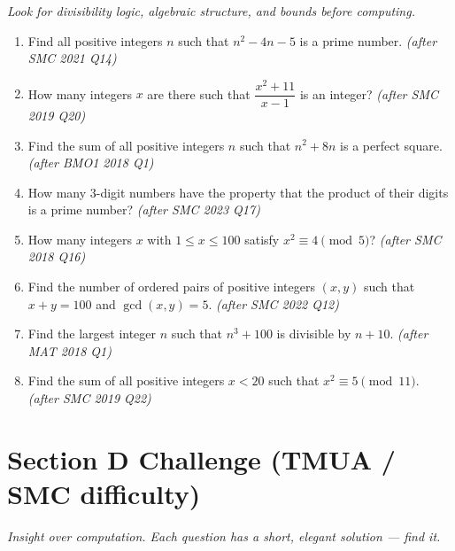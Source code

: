 \documentclass[11pt,a4paper]{article}
\begin{document}
\noindent\textit{Look for divisibility logic, algebraic structure, and bounds before computing.}

\begin{enumerate}

\item Find all positive integers $n$ such that $n^2 - 4n - 5$ is a prime number. \textit{\small(after SMC 2021 Q14)}

\item How many integers $x$ are there such that $\dfrac{x^2+11}{x-1}$ is an integer? \textit{\small(after SMC 2019 Q20)}

\item Find the sum of all positive integers $n$ such that $n^2 + 8n$ is a perfect square. \textit{\small(after BMO1 2018 Q1)}

\item How many 3-digit numbers have the property that the product of their digits is a prime number? \textit{\small(after SMC 2023 Q17)}

\item How many integers $x$ with $1 \le x \le 100$ satisfy $x^2 \equiv 4 \pmod 5$? \textit{\small(after SMC 2018 Q16)}

\item Find the number of ordered pairs of positive integers $(x,y)$ such that $x+y=100$ and $\gcd(x,y)=5$. \textit{\small(after SMC 2022 Q12)}

\item Find the largest integer $n$ such that $n^3 + 100$ is divisible by $n+10$. \textit{\small(after MAT 2018 Q1)}

\item Find the sum of all positive integers $x < 20$ such that $x^2 \equiv 5 \pmod{11}$. \textit{\small(after SMC 2019 Q22)}

\end{enumerate}

\section*{Section D \quad Challenge \hfill{\normalfont\small(TMUA / SMC difficulty)}}

\noindent\textit{Insight over computation. Each question has a short, elegant solution --- find it.}
\end{document}
